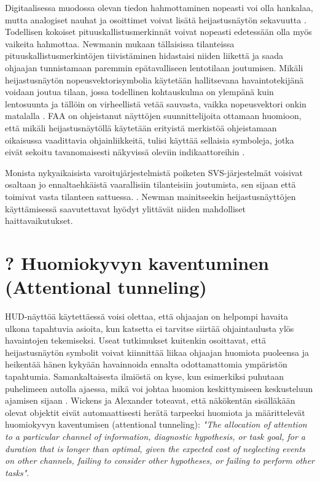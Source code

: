 \documentclass[utf8,bachelor,manualbib]{gradu3}
\begin{document}
Digitaalisessa muodossa olevan tiedon hahmottaminen nopeasti voi olla hankalaa, mutta analogiset nauhat ja osoittimet voivat lisätä heijastusnäytön sekavuutta \citeyearpar{zuschlag2003}. Todellisen kokoiset pituuskallistusmerkinnät voivat nopeasti edetessään olla myös vaikeita hahmottaa. Newmanin \citeyearpar{newman1995} mukaan tällaisissa tilanteissa pituuskallistusmerkintöjen tiivistäminen hidastaisi niiden liikettä ja saada ohjaajan tunnistamaan paremmin epätavalliseen lentotilaan joutumisen. Mikäli heijastusnäytön nopeusvektorisymbolia käytetään hallitsevana havaintotekijänä voidaan joutua tilaan, jossa todellinen kohtauskulma on ylempänä kuin lentosuunta ja tällöin on virheellistä vetää sauvasta, vaikka nopeusvektori onkin matalalla \citep{crawfordneal2006}. FAA on ohjeistanut näyttöjen suunnittelijoita ottamaan huomioon, että mikäli heijastusnäytöllä käytetään erityistä merkistöä ohjeistamaan oikaisussa vaadittavia ohjainliikkeitä, tulisi käyttää sellaisia symboleja, jotka eivät sekoitu tavanomaisesti näkyvissä oleviin indikaattoreihin \citep{crawfordneal2006}.

Monista nykyaikaisista varoitujärjestelmistä poiketen SVS-järjestelmät voisivat osaltaan jo ennaltaehkäistä vaarallisiin tilanteisiin joutumista, sen sijaan että toimivat vasta tilanteen sattuessa. \citep{schnellym2004}. Newman \citeyearpar{newman2000} mainitseekin heijastusnäyttöjen käyttämisessä saavutettavat hyödyt ylittävät niiden mahdolliset haittavaikutukset.

\section{? Huomiokyvyn kaventuminen (Attentional tunneling)}

HUD-näyttöä käytettäessä voisi olettaa, että ohjaajan on helpompi havaita ulkona tapahtuvia asioita, kun katsetta ei tarvitse siirtää ohjaintaulusta ylös havaintojen tekemiseksi. Useat tutkimukset \citep{fischerym1980, weintraubensing1992, wickenslong1995, wickensalexander2009} kuitenkin osoittavat, että heijastusnäytön symbolit voivat kiinnittää liikaa ohjaajan huomiota puoleensa ja heikentää hänen kykyään havainnoida ennalta odottamattomia ympäristön tapahtumia. Samankaltaisesta ilmiöstä on kyse, kun esimerkiksi puhutaan puhelimeen autolla ajaessa, mikä voi johtaa huomion keskittymiseen keskusteluun ajamisen sijaan \citep{horreywickens2006, strayerdrews2007, strayerym2001}. Wickens ja Alexander \citeyearpar{wickensalexander2009} toteavat, että näkökentän sisälläkään olevat objektit eivät automaattisesti herätä tarpeeksi huomiota ja määrittelevät huomiokyvyn kaventumisen (attentional tunneling): \emph{"The allocation of attention to a particular channel of information, diagnostic hypothesis, or task goal, for a duration that is longer than optimal, given the expected cost of neglecting events on other channels, failing to consider other hypotheses, or failing to perform other tasks"}.
\end{document}
